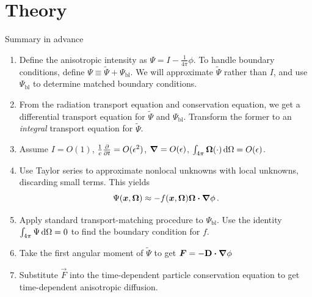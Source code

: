 \documentclass{beamer}
\begin{document}
\section{Theory}
\begin{frame}{Summary in advance}
\begin{enumerate}
  \item Define the anisotropic intensity as $\Psi = I -
    \frac{1}{4\pi}\phi$. To handle boundary conditions, define $\Psi
    \equiv \tilde \Psi + \Psi_\mathrm{bl}$. We will approximate $\tilde \Psi$
    rather than $I$, and use $\Psi_\mathrm{bl}$ to determine matched boundary
    conditions.
  \item From the radiation transport equation and conservation equation, we get
    a differential transport equation for $\tilde \Psi$ and $\Psi_\mathrm{bl}$.
    Transform the former to an \emph{integral} transport equation for $\tilde
    \Psi$.
  \item Assume $I=O(1)$, $\frac1c\frac{\partial }{\partial t}=O(\epsilon^2)$, $\bm{\nabla} =
    O(\epsilon)$, $\int_{4\pi} \bm{\Omega} (\cdot) \mathop{}\!\mathrm{d} \Omega = O(\epsilon)$.
  \item Use Taylor series to approximate nonlocal unknowns with local
    unknowns, discarding small terms. This yields
    \begin{equation*}
      \Psi(\bm{x}, \bm{\Omega})
      \approx - f(\bm{x}, \bm{\Omega})  \bm{\Omega} \bm{\cdot} \bm{\nabla} \phi\,.
    \end{equation*}
  \item Apply standard transport-matching procedure to $\Psi_\mathrm{bl}$. Use
    the identity $\int_{4\pi} \Psi \mathop{}\!\mathrm{d} \Omega=0$ to find the boundary condition
    for $f$.
  \item Take the first angular moment of $\tilde \Psi$ to get
    $\bm{F}=-\mathbf{D} \bm{\cdot} \bm{\nabla} \phi$
  \item Substitute $\vec{F}$ into the time-dependent particle
    conservation equation to get time-dependent anisotropic diffusion.
\end{enumerate}
\end{frame}
\end{document}
